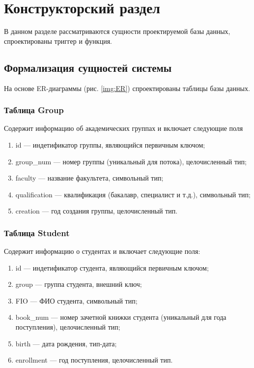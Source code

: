 \chapter{Конструкторский раздел}

В данном разделе рассматриваются сущности проектируемой базы данных, спроектированы триггер и функция.

\section{Формализация сущностей системы}
На основе ER-диаграммы (рис. \ref{img:ER}) спроектированы таблицы базы данных.

\subsection*{Таблица Group}

Содержит информацию об академических группах и включает следующие поля

\begin{enumerate}
	\item id --- индетификатор группы, являющийся первичным ключом;
	\item group\_num --- номер группы (уникальный для потока), целочисленный тип;
	\item faculty --- название факультета, символьный тип;
	\item qualification --- квалификация (бакалавр, специалист и т.д.), символьный тип;
	\item creation --- год создания группы, целочисленный тип.
\end{enumerate}


\subsection*{Таблица Student}

Содержит информацию о студентах и включает следующие поля:

\begin{enumerate}
	\item id --- индетификатор студента, являющийся первичным ключом;
	\item group --- группа студента, внешний ключ;
	\item FIO --- ФИО студента, символьный тип;
	\item book\_num --- номер зачетной книжки студента (уникальный для года поступления), целочисленный тип;
	\item birth --- дата рождения, тип-дата;
	\item enrollment --- год поступления, целочисленный тип.
\end{enumerate}

